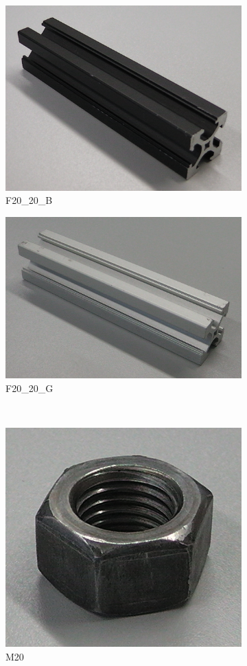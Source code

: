\begin{figure}[!htb]
\begin{subfigure}{.3\textwidth}
  \label{fig:distanceTube}
\end{subfigure}
\begin{subfigure}{.3\textwidth}
  \centering
  \includegraphics[width=.5\linewidth]{images/F20_20_B}
  \caption{F20\_20\_B \cite{github_robocup@work}}
  \label{fig:F20_20_B}
\end{subfigure}
\begin{subfigure}{.3\textwidth}
  \centering
  \includegraphics[width=.5\linewidth]{images/F20_20_G}
  \caption{F20\_20\_G \cite{github_robocup@work}}
  \label{fig:F20_20_G}
\end{subfigure}\\
\vspace{3mm}
\begin{subfigure}{.3\textwidth}
  \centering
  \includegraphics[width=.5\linewidth]{images/M20}
  \caption{M20 \cite{github_robocup@work}}
  \label{fig:M20}
\end{subfigure}
\begin{subfigure}{.3\textwidth}

\end{subfigure}
\end{figure}
